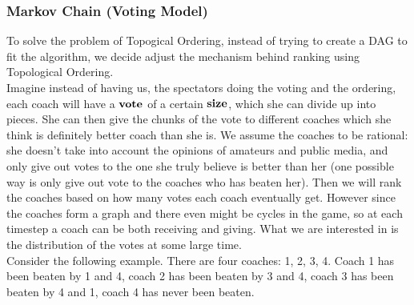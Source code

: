 \documentclass[titlepage]{article}
\begin{document}
\subsubsection{Markov Chain (Voting Model)}

To solve the problem of Topogical Ordering, instead of trying to create a DAG to fit the algorithm, we decide adjust the mechanism behind ranking using Topological Ordering.
\\

\noindent Imagine instead of having us, the spectators doing the voting and the ordering, each coach will have a $\bf{vote}$ of a certain $\bf{size}$, which she can divide up into pieces. She can then give the chunks of the vote to different coaches which she think is definitely better coach than she is. We assume the coaches to be rational: she doesn't take into account the opinions of amateurs and public media, and only give out votes to the one she truly believe is better than her (one possible way is only give out vote to the coaches who has beaten her). Then we will rank the coaches based on how many votes each coach eventually get. However since the coaches form a graph and there even might be cycles in the game, so at each timestep a coach can be both receiving and giving. What we are interested in is the distribution of the votes at some large time.
\\

\noindent Consider the following example. There are four coaches: 1, 2, 3, 4. Coach 1 has been beaten by 1 and 4, coach 2 has been beaten by 3 and 4, coach 3 has been beaten by 4 and 1, coach 4 has never been beaten.

\begin{center}
\end{center}
\end{document}

